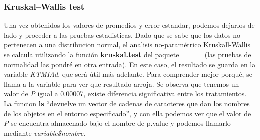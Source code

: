 \documentclass[]{article}
\newenvironment{Shaded}{\begin{snugshade}}{\end{snugshade}}
\newcommand{\DataTypeTok}[1]{\textcolor[rgb]{0.13,0.29,0.53}{#1}}
\newcommand{\DecValTok}[1]{\textcolor[rgb]{0.00,0.00,0.81}{#1}}
\newcommand{\KeywordTok}[1]{\textcolor[rgb]{0.13,0.29,0.53}{\textbf{#1}}}
\newcommand{\NormalTok}[1]{#1}
\newcommand{\OperatorTok}[1]{\textcolor[rgb]{0.81,0.36,0.00}{\textbf{#1}}}
\newcommand{\OtherTok}[1]{\textcolor[rgb]{0.56,0.35,0.01}{#1}}
\newcommand{\StringTok}[1]{\textcolor[rgb]{0.31,0.60,0.02}{#1}}
\begin{document}
\begin{Shaded}
\end{Shaded}

\hypertarget{kruskalwallis-test}{%
\subsubsection{Kruskal--Wallis test}\label{kruskalwallis-test}}

Una vez obtenidos los valores de promedios y error estandar, podemos
dejarlos de lado y proceder a las pruebas estadisticas. Dado que se sabe
que los datos no pertenecen a una distribucion normal, el analisis
no-paramétrico Kruskall-Wallis se calcula utilizando la función
\textbf{kruskal.test} del paquete \_\_\_\_ (las pruebas de normalidad
las pondré en otra entrada). En este caso, el resultado se guarda en la
variable \emph{KTMIAd}, que será útil más adelante. Para comprender
mejor porqué, se llama a la variable para ver que resultado arroja. Se
observa que tenemos un valor de \emph{P} igual a 0.00007, existe
diferencia significativa entre los tratamientos. La funcion \textbf{ls}
``devuelve un vector de cadenas de caracteres que dan los nombres de los
objetos en el entorno especificado'', y con ella podemos ver que el
valor de \emph{P} se encuentra almacenado bajo el nombre de p.value y
podemos llamarlo mediante \emph{variable\$nombre}.
\end{document}
